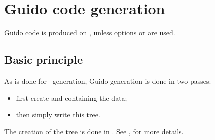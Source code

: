 



\chapter{Guido code generation}


Guido code is produced on \standardOutput, unless options  or  are used.


\section{Basic principle}

As is done for \mxml\ generation, Guido generation is done in two passes:
\begin{itemize}
\item first create and  containing the data;
\item then simply write this tree.
\end{itemize}

The creation of the tree is done in .
See , for more details.
